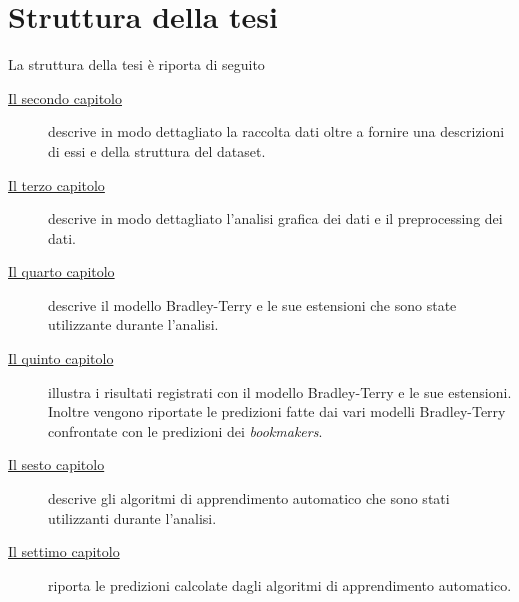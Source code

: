 \section{Struttura della tesi}
La struttura della tesi è riporta di seguito
\begin{description}

\item[{\hyperref[cap:dataset]{Il secondo capitolo}}] descrive in modo dettagliato la raccolta dati oltre a fornire una descrizioni di essi e della struttura del dataset. 
\item[{\hyperref[cap:Analisi]{Il terzo capitolo}}] descrive in modo dettagliato l'analisi grafica dei dati e il preprocessing dei dati. 
\item[{\hyperref[cap:BT]{Il quarto capitolo}}] descrive il modello Bradley-Terry e le sue estensioni che sono state utilizzante durante l'analisi.
\item[{\hyperref[cap:risultatiDM]{Il quinto capitolo}}] illustra i risultati registrati con il modello Bradley-Terry e le sue estensioni. Inoltre vengono riportate le predizioni fatte dai vari modelli Bradley-Terry confrontate con le predizioni dei \emph{bookmakers}.
\item[{\hyperref[cap:ML]{Il sesto capitolo}}] descrive gli algoritmi di apprendimento automatico che sono stati utilizzanti durante l'analisi.
\item[{\hyperref[cap:RisML]{Il settimo capitolo}}] riporta le predizioni calcolate dagli algoritmi di apprendimento automatico.
\end{description}





\begin{comment}
\begin{figure}[h]
	\begin{center}
		\texttt{[image: Logo\_azzurrodigite.png]}
		\caption{Logo di AzzurroDigitale}
	\end{center}
\end{figure}	contenuto...
\end{comment}






    
    
    
